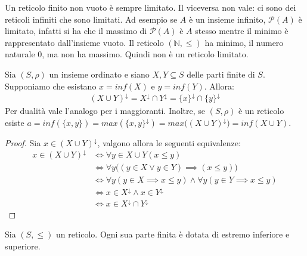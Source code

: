 \begin{osservation}
	Un reticolo finito non vuoto è sempre limitato. Il viceversa non vale: ci sono dei reticoli infiniti che sono limitati. Ad esempio se $A$ è un insieme infinito, $\mathcal{P}(A)$ è limitato, infatti si ha che il massimo di $\mathcal{P}(A)$ è $A$ stesso mentre il minimo è rappresentato dall'insieme vuoto. Il reticolo $(\mathbb{N},\leq)$ ha minimo, il numero naturale 0, ma non ha massimo. Quindi non è un reticolo limitato.
\end{osservation}


\begin{propbox}\label{prop_demorgan_minimali}
	Sia $(S,\rho)$ un insieme ordinato e siano $X,Y \subseteq S$ delle parti finite di $S$. Supponiamo che esistano $x= inf (X)$ e $y=inf(Y)$. Allora:
	\begin{align*}
		(X \cup Y )^{\downarrow} = X^{\downarrow} \cap Y^{\downarrow} = \{x\}^{\downarrow} \cap \{y\}^{\downarrow}
	\end{align*}
	Per dualità vale l'analogo per i maggioranti. Inoltre, se $(S,\rho)$ è un reticolo esiste $a=inf (\{x,y\}) = max(\{x,y\}^{\downarrow}) = max\bigl((X \cup Y)^{\downarrow}\bigr) = inf(X \cup Y)$.
\end{propbox}
\begin{proof}
	Sia $x \in (X \cup Y)^{\downarrow}$, valgono allora le seguenti equivalenze:
	\begin{align*}
		x \in (X \cup Y)^{\downarrow} &\iff \forall y \in X \cup Y (x\leq y) \\
		&\iff \forall y \bigl( (y \in X \lor y \in Y) \implies (x \leq y) \bigr) \\
		&\iff \forall y (y \in X \implies x \leq y) \land \forall y (y \in Y \implies x \leq y)\\
		&\iff x \in X^{\downarrow} \land x \in Y^{\downarrow}\\
		&\iff x \in X^{\downarrow} \cap Y^{\downarrow}
	\end{align*}
\end{proof}
\begin{corolbox}\label{corol:inf_sup}
	Sia $(S,\leq)$ un reticolo. Ogni sua parte finita è dotata di estremo inferiore e superiore.
\end{corolbox}
